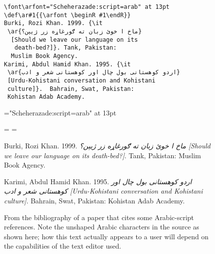 \begin{figure}[htb]
\begin{minipage}{0.6\hsize}
\begin{verbatim}
\font\arfont="Scheherazade:script=arab" at 13pt
\def\ar#1{{\arfont \beginR #1\endR}}
Burki, Rozi Khan. 1999. {\it 
 \ar{ماخ ا خوئ زبان ته ګورغاړه زر ژيېن؟}
  [Should we leave our language on its
   death-bed?]}. Tank, Pakistan:
  Muslim Book Agency.
Karimi, Abdul Hamid Khan. 1995. {\it
 \ar{اردو كوهستانی بول چال اور كوهستانی شعر و ادب}
 [Urdu-Kohistani conversation and Kohistani
 culture]}.  Bahrain, Swat, Pakistan: 
 Kohistan Adab Academy.
\end{verbatim}
\end{minipage}%
\begin{minipage}{0.4\hsize}
\font\arfont="Scheherazade:script=arab" at 13pt
\lineskiplimit=-10pt
\def\ar#1{{\arfont\beginR#1\endR}}

\everypar={\hangindent=20pt 
 \parskip=\medskipamount}

Burki, Rozi Khan. 1999. {\it \ar{ماخ ا خوئ زبان ته ګورغاړه زر ژيېن؟} [Should we leave our language on its death-bed?]}. Tank, Pakistan: Muslim Book Agency.

Karimi, Abdul Hamid Khan. 1995. {\it \ar{اردو كوهستانی بول چال اور كوهستانی شعر و ادب} [Urdu-Kohistani conversation and Kohistani culture]}. Bahrain, Swat, Pakistan: Kohistan Adab Academy.
\end{minipage}
\caption{From the bibliography of a paper that cites some Arabic-script references. Note the unshaped Arabic characters in the source as shown here; how this text actually appears to a user will depend on the capabilities of the text editor used.}
\end{figure}

